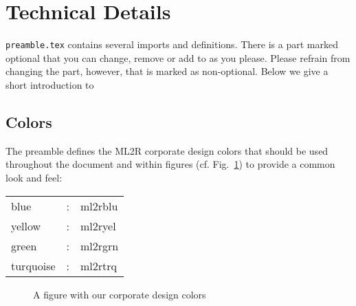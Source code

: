 \documentclass[fleqn,svgnames]{ml2rcn}
\begin{document}
\section{Technical Details}
\verb+preamble.tex+ contains several imports and definitions. 
There is a part marked optional that you can change, remove or add to as you please. 
Please refrain from changing the part, however, that is marked as non-optional.
Below we give a short introduction to 

\subsection{Colors}
The preamble defines the ML2R corporate design colors that should be used throughout the document and within figures (cf. Fig.~\ref{colors}) to provide a common look and feel:

\vspace{0.5em}
\begin{center}
\begin{tabular}{lcl}
\textcolor{ml2rblu}{blue} & : & \textcolor{ml2rblu}{ml2rblu} \\
\textcolor{ml2ryel}{yellow} & : & \textcolor{ml2ryel}{ml2ryel} \\
\textcolor{ml2rgrn}{green} & : & \textcolor{ml2rgrn}{ml2rgrn} \\
\textcolor{ml2rtrq}{turquoise} & : & \textcolor{ml2rtrq}{ml2rtrq} \\
 \end{tabular} 
\end{center}

\begin{figure}
\caption{A figure with our corporate design colors}
\label{colors}
\end{figure}
\end{document}

